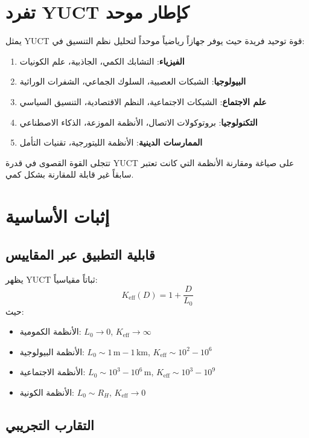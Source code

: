 \documentclass[12pt,a4paper]{article}
\begin{document}
	\section{تفرد YUCT كإطار موحد}
	
	يمثل YUCT قوة توحيد فريدة حيث يوفر جهازاً رياضياً موحداً لتحليل نظم التنسيق في:
	\begin{enumerate}
		\item \textbf{الفيزياء}: التشابك الكمي، الجاذبية، علم الكونيات
		\item \textbf{البيولوجيا}: الشبكات العصبية، السلوك الجماعي، الشفرات الوراثية
		\item \textbf{علم الاجتماع}: الشبكات الاجتماعية، النظم الاقتصادية، التنسيق السياسي
		\item \textbf{التكنولوجيا}: بروتوكولات الاتصال، الأنظمة الموزعة، الذكاء الاصطناعي
		\item \textbf{الممارسات الدينية}: الأنظمة الليتورجية، تقنيات التأمل
	\end{enumerate}
	
	تتجلى القوة القصوى في قدرة YUCT على صياغة ومقارنة الأنظمة التي كانت تعتبر سابقاً غير قابلة للمقارنة بشكل كمي.
	
	\section{إثبات الأساسية}
	
	\subsection{قابلية التطبيق عبر المقاييس}
	
	يظهر YUCT ثباتاً مقياسياً:
	\[
	K_{\mathrm{eff}}(D) = 1 + \frac{D}{L_0}
	\]
	حيث:
	\begin{itemize}
		\item الأنظمة الكمومية: $L_0 \to 0$, $K_{\mathrm{eff}} \to \infty$
		\item الأنظمة البيولوجية: $L_0 \sim 1\,\mathrm{m}-1\,\mathrm{km}$, $K_{\mathrm{eff}} \sim 10^2-10^6$
		\item الأنظمة الاجتماعية: $L_0 \sim 10^3-10^6\,\mathrm{m}$, $K_{\mathrm{eff}} \sim 10^3-10^9$
		\item الأنظمة الكونية: $L_0 \sim R_H$, $K_{\mathrm{eff}} \to 0$
	\end{itemize}
	
	\subsection{التقارب التجريبي}
	
\end{document}

